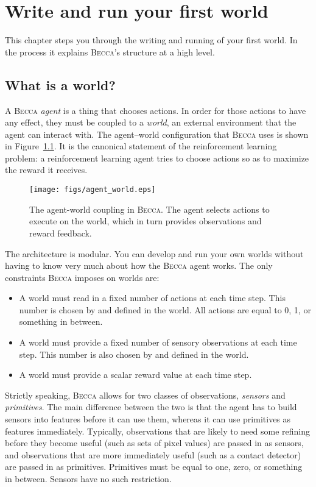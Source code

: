 \chapter{Write and run your first world}

This chapter steps you through the writing and running of your first world. In the process it explains \textsc{Becca}'s structure at a high level.

\section{What is a world?}

A \textsc{Becca} {\em agent} is a thing that chooses actions. In order for those actions to have any effect, they must be coupled to a {\em world}, an external environment that the agent can interact with. The agent--world configuration that \textsc{Becca} uses is shown in Figure~\ref{agent_world}. It is the canonical statement of the reinforcement learning problem: a reinforcement learning agent tries to choose actions so as to maximize the reward it receives.~\cite{sutton98} 

\begin{figure}
\centering
\texttt{[image: figs/agent\_world.eps]}
\caption{The agent-world coupling in \textsc{Becca}. The agent selects actions to execute on the world, which in turn provides observations and reward feedback.}
\label{agent_world}
\end{figure}

The architecture is modular. You can develop and run your own worlds without having to know very much about how the \textsc{Becca} agent works. The only constraints \textsc{Becca} imposes on worlds are:

\begin{itemize}
\item{A world must read in a fixed number of actions at each time step. This number is chosen by and defined in the world. All actions are equal to 0, 1, or something in between.}
\item{A world must provide a fixed number of sensory observations at each time step. This number is also chosen by and defined in the world.}
\item{A world must provide a scalar reward value at each time step.}
\end{itemize}

Strictly speaking, \textsc{Becca} allows for two classes of observations, {\em sensors} and {\em primitives}. The main difference between the two is that the agent has to build sensors into features before it can use them, whereas it can use primitives as features immediately. Typically, observations that are likely to need some refining before they become useful (such as sets of pixel values) are passed in as sensors, and observations that are more immediately useful (such as a contact detector) are passed in as primitives. Primitives must be equal to one, zero, or something in between. Sensors have no such restriction.

